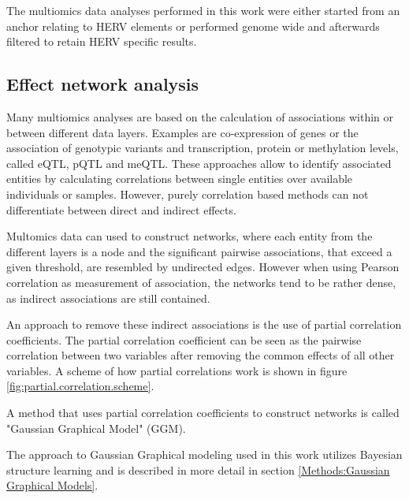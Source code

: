 \documentclass[a4paper,12pt,twoside,openright]{article}
\begin{document}

The multiomics data analyses performed in this work were either started from an anchor relating to HERV elements or performed genome wide and afterwards filtered to retain HERV specific results. 

\subsection{Effect network analysis}
\label{Introduction:Effect network analysis}
Many multiomics analyses are based on the calculation of associations within or between different data layers. Examples are co-expression of genes or the association of genotypic variants and transcription, protein or methylation levels, called eQTL, pQTL and meQTL. These approaches allow to identify associated entities by calculating correlations between single entities over available individuals or samples. However, purely correlation based methods can not differentiate between direct and indirect effects\cite{Hasin2017}.

Multomics data can used to construct networks, where each entity from the different layers is a node and the significant pairwise associations, that exceed a given threshold, are resembled by undirected edges. However when using Pearson correlation as measurement of association, the networks tend to be rather dense, as indirect associations are still contained\cite{Krumsiek2011}. 

An approach to remove these indirect associations is the use of partial correlation coefficients. The partial correlation coefficient can be seen as the pairwise correlation between two variables after removing the common effects of all other variables. A scheme of how partial correlations work is shown in figure \ref{fig:partial.correlation.scheme}.

A method that uses partial correlation coefficients to construct networks is called "Gaussian Graphical Model"\cite{Krumsiek2011} (GGM). 

The approach to Gaussian Graphical modeling used in this work utilizes Bayesian structure learning and is described in more detail in section \ref{Methods:Gaussian Graphical Models}.
\end{document}
